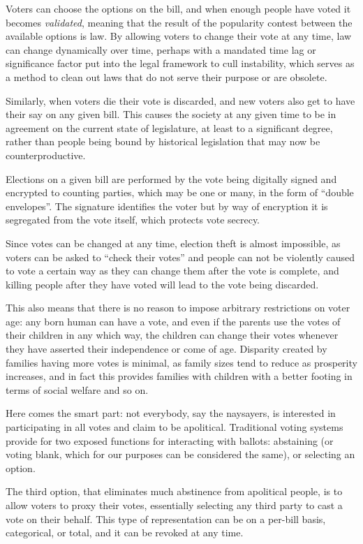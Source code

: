 Voters can choose the options on the bill, and when enough people have voted it
becomes \textit{validated}, meaning that the result of the popularity contest
between the available options is law. By allowing voters to change their vote 
at any time, law can change dynamically over time, perhaps with a mandated time
lag or signif\hbox{}icance factor put into the legal framework to cull
instability, which serves as a method to clean out laws that do not serve their
purpose or are obsolete. 

Similarly, when voters die their vote is discarded, and new voters also get to
have their say on any given bill. This causes the society at any given time to
be in agreement on the current state of legislature, at least to a
signif\hbox{}icant degree, rather than people being bound by historical
legislation that may now be counterproductive.

Elections on a given bill are performed by the vote being digitally signed and
encrypted to counting parties, which may be one or many, in the form of 
``double envelopes''. The signature identif\hbox{}ies the voter but by way of
encryption it is segregated from the vote itself, which protects vote secrecy.

Since votes can be changed at any time, election theft is almost impossible, as
voters can be asked to ``check their votes'' and people can not be violently
caused to vote a certain way as they can change them after the vote is 
complete, and killing people after they have voted will lead to the vote being
discarded.

This also means that there is no reason to impose arbitrary restrictions on
voter age: any born human can have a vote, and even if the parents use the 
votes of their children in any which way, the children can change their votes
whenever they have asserted their independence or come of age. Disparity 
created by families having more votes is minimal, as family sizes tend to 
reduce as prosperity increases, and in fact this provides families with 
children with a better footing in terms of social welfare and so on.

Here comes the smart part: not everybody, say the naysayers, is interested in
participating in all votes and claim to be apolitical. Traditional voting
systems provide for two exposed functions for interacting with ballots:
abstaining (or voting blank, which for our purposes can be considered the 
same), or selecting an option.

The third option, that eliminates much abstinence from apolitical people, is to
allow voters to proxy their votes, essentially selecting any third party to 
cast a vote on their behalf. This type of representation can be on a per-bill
basis, categorical, or total, and it can be revoked at any time.

